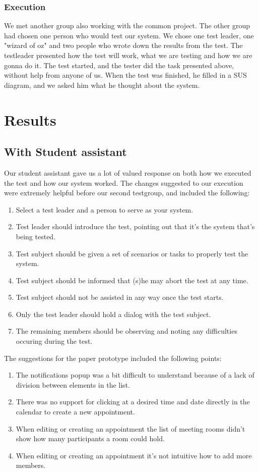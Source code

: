 \documentclass{article}
\begin{document}
\subsubsection*{Execution}
We met another group also working with the common project. The other group had chosen one person who would test our system. We chose one test leader, one "wizard of oz" and two people who wrote down the results from the test. The testleader presented how the test will work, what we are testing and how we are gonna do it. The test started, and the tester did the task presented above, without help from anyone of us. When the test was finished, he filled in a SUS diagram, and we asked him what he thought about the system.

\section{Results}
\subsection{With Student assistant}
Our student assistant gave us a lot of valued response on both how we executed the test and how our system worked. The changes suggested to our execution were extremely helpful before our second testgroup, and included the following:
\begin{enumerate}
\item Select a test leader and a person to serve as your system.
\item Test leader should introduce the test, pointing out that it's the system that's being tested. 
\item Test subject should be given a set of scenarios or tasks to properly test the system. 
\item Test subject should be informed that (s)he may abort the test at any time.
\item Test subject should not be assisted in any way once the test starts.
\item Only the test leader should hold a dialog with the test subject.
\item The remaining members should be observing and noting any difficulties occuring during the test.
\end{enumerate}

The suggestions for the paper prototype included the following points:
\begin{enumerate}
\item The notifications popup was a bit difficult to understand because of a lack of division between elements in the list.
\item There was no support for clicking at a desired time and date directly in the calendar to create a new appointment.
\item When editing or creating an appointment the list of meeting rooms didn't show how many participants a room could hold.
\item When editing or creating an appointment it's not intuitive how to add more members.
\end{enumerate}
\end{document}
